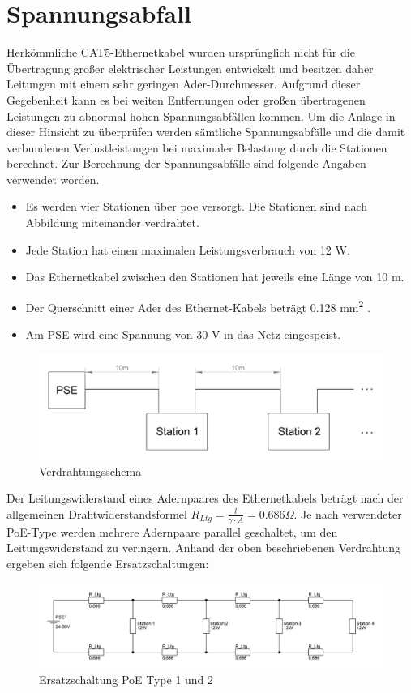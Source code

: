 \wip
\section{Spannungsabfall}
Herkömmliche CAT5-Ethernetkabel wurden ursprünglich nicht für die Übertragung großer elektrischer Leistungen entwickelt und besitzen daher Leitungen mit einem sehr geringen Ader-Durchmesser.
Aufgrund dieser Gegebenheit kann es bei weiten Entfernungen oder großen übertragenen Leistungen zu abnormal hohen Spannungsabfällen kommen.
Um die Anlage in dieser Hinsicht zu überprüfen werden sämtliche Spannungsabfälle und die damit verbundenen Verlustleistungen bei maximaler Belastung durch die Stationen berechnet.
Zur Berechnung der Spannungsabfälle sind folgende Angaben verwendet worden.
\begin{itemize}
	\item Es werden vier Stationen über \ac{poe} versorgt.
	Die Stationen sind nach Abbildung  miteinander verdrahtet.
	\item Jede Station hat einen maximalen Leistungsverbrauch von 12 W.
	\item Das Ethernetkabel zwischen den Stationen hat jeweils eine Länge von 10 m.
	\item Der Querschnitt einer Ader des Ethernet-Kabels beträgt 0.128 mm\textsuperscript{2} \cite[vgl.][]{lapp-cat5-datasheet}.
	\item Am PSE wird eine Spannung von 30 V in das Netz eingespeist.
\end{itemize}
\begin{figure}[H]
	\centering
	\includegraphics[width=.9\linewidth]{images/berechnung/poe_verdrahtung.png}
	\caption{Verdrahtungsschema}
	\label{fig:poe-verdrahtung}
\end{figure}
Der Leitungswiderstand eines Adernpaares des Ethernetkabels beträgt nach der allgemeinen Drahtwiderstandsformel $R_{Ltg}=\frac{l}{\gamma\cdot A}=0.686\Omega$.
Je nach verwendeter PoE-Type werden mehrere Adernpaare parallel geschaltet, um den Leitungswiderstand zu veringern.
Anhand der oben beschriebenen Verdrahtung ergeben sich folgende Ersatzschaltungen:
\begin{figure}[H]
	\centering
	\includegraphics[width=\linewidth]{images/berechnung/poe2pair.png}
	\caption{Ersatzschaltung PoE Type 1 und 2}
\end{figure}
